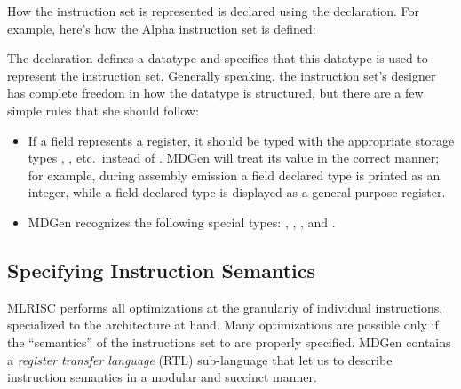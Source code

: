 How the instruction set is represented is declared using the
 declaration.  For example, here's how the Alpha instruction
set is defined:

The  declaration defines a datatype and specifies
that this datatype is used to represent the instruction set.  Generally
speaking, the instruction set's designer has complete freedom in how the
datatype is structured, but there are a few simple rules that she should
follow:
\begin{itemize}
  \item If a field represents a register, it should be typed
with the appropriate storage types , 
, etc.~instead 
of .   MDGen will treat its value in the correct manner; for
example, during assembly emission a field declared type  is
printed as an integer, while a field declared type  is displayed
as a general purpose register.
  \item MDGen recognizes the following special 
types: , , , and .
\end{itemize}

\subsection{Specifying Instruction Semantics}
   MLRISC performs all optimizations at 
the granulariy of individual instructions,
specialized to the architecture at hand.  Many
optimizations are possible only if the ``semantics'' of the 
instructions set to are properly specified.  MDGen contains a 
\emph{register transfer language} (RTL) sub-language that let us to describe
instruction semantics in a modular and succinct manner.  
 
